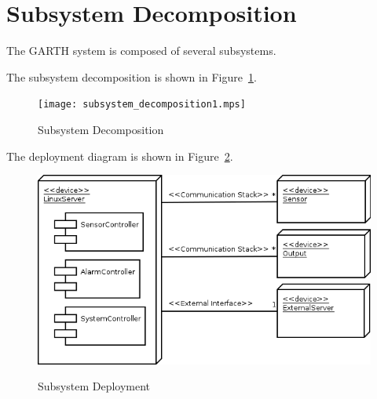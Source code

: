 \documentclass{report}
\begin{document}

\section{Subsystem Decomposition}



The GARTH system is composed of several subsystems. 

The subsystem decomposition is shown in Figure~\ref{fig:subsystem_decomposition}.

\begin{figure}[hp]
    \centering
        \caption{Subsystem Decomposition}
        \scriptsize
        \setlength{\unitlength}{2.0em}
        \texttt{[image: subsystem\_decomposition1.mps]}
        \normalsize
    \label{fig:subsystem_decomposition}
\end{figure}

The deployment diagram is shown in Figure~\ref{fig:subsystem_deployment}.

\begin{figure}[hp]
  \centering
  \caption{Subsystem Deployment}
  \includegraphics[scale=0.5]{deployment.png}
  \label{fig:subsystem_deployment}
\end{figure}
\end{document}
